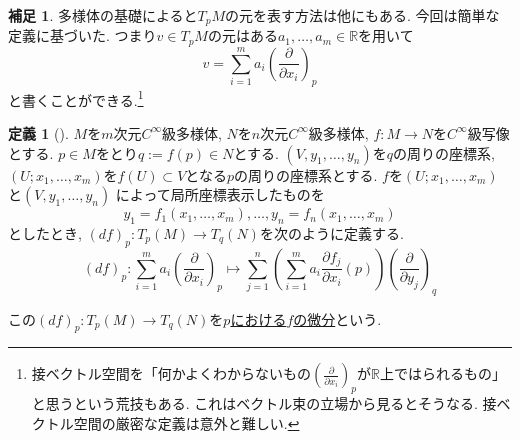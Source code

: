 \documentclass[dvipdfmx,a4paper,11pt]{article}
\newcommand{\R}{\mathbb{R}}
\theoremstyle{definition}
\newtheorem{dfn}[thm]{定義}
\newtheorem{rem}[thm]{補足}
\newcommand{\pdrv}[2]{\frac{\partial #1}{\partial #2}}
\begin{document}
    \begin{rem}
多様体の基礎によると$T_{p}M$の元を表す方法は他にもある. 今回は簡単な定義に基づいた.  つまり$v \in T_{p}M$の元はある$a_1, \ldots, a_m \in \R$を用いて
     $$
     v = \sum_{i=1}^{m} a_i \left(\pdrv{}{x_i}\right)_{p} $$
     と書くことができる.\footnote{接ベクトル空間を「何かよくわからないもの$(\pdrv{}{x_i})_{p}$が$\R$上ではられるもの」と思うという荒技もある. これはベクトル束の立場から見るとそうなる. 接ベクトル空間の厳密な定義は意外と難しい.}
          
    \end{rem}
    

\begin{tcolorbox}[
    colback = white,
    colframe = green!35!black,
    fonttitle = \bfseries,
    breakable = true]
    \begin{dfn}[]
    \label{differential}
    $M$を$m$次元$C^{\infty}$級多様体, $N$を$n$次元$C^{\infty}$級多様体, $f: M \rightarrow N$を$C^{\infty}$級写像とする. 
    $p \in M$をとり$q := f(p) \in N$とする. 
$(V, y_1, \ldots, y_n)$を$q$の周りの座標系, $(U; x_1, \ldots, x_m)$を$f(U) \subset V$となる$p$の周りの座標系とする.
         $f$を$(U; x_1, \ldots, x_m)$と$(V, y_1, \ldots, y_n)$ によって局所座標表示したものを
$$y_1=f_1(x_1, \ldots, x_m), \ldots, y_n=f_n(x_1, \ldots, x_m)$$
としたとき, $(df)_{p} : T_{p}(M) \rightarrow T_{q}(N)$を次のように定義する.
$$ (df)_{p} : \sum_{i=1}^{m} a_i \left(\pdrv{}{x_i}\right)_{p}  \mapsto 
\sum_{j=1}^{n} \left(\sum_{i=1}^{m} a_i  \pdrv{f_{j}}{x_i}(p) \right)  \left(\pdrv{}{y_j}\right)_{q} $$
     
この$(d f)_{p} : T_{p}(M) \rightarrow T_{q}(N)$を\underline{$p$における$f$の微分}という.
    \end{dfn}
    \end{tcolorbox} 
    
\end{document}
